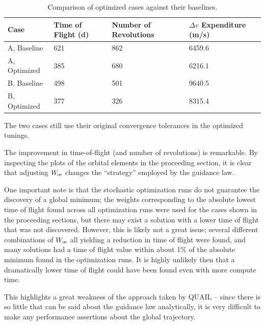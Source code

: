 \begin{table}[H]
    \centering
    \begin{tabular}{L{5cm}L{2.5cm}L{2.5cm}L{3cm}}
        \toprule
        \textbf{Case}                          & Time of Flight (d) & Number of Revolutions & \(\Delta v\) Expenditure (m/s) \\
        \midrule
        A, Baseline                            & 621                & 862                   & 6459.6                         \\
        A, Optimized  & 385                & 680                   & 6216.1                         \\
        B, Baseline                            & 498                & 501                   & 9640.5                         \\
         B, Optimized & 377                & 326                   & 8315.4                         \\
        \bottomrule
    \end{tabular}
    \caption{Comparison of optimized cases against their baselines.}
    \label{tab:outputs_2_summary}
\end{table}

The two cases still use their original convergence tolerances in the optimized tunings.

The improvement in time-of-flight (and number of revolutions) is remarkable. By inspecting the plots of the orbital elements in the proceeding section, it is clear that adjusting \(W_\moe\) changes the ``strategy'' employed by the guidance law.

One important note is that the stochastic optimization runs do not guarantee the discovery of a global minimum; the weights corresponding to the absolute lowest time of flight found across all optimization runs were used for the cases shown in the proceeding sections, but there may exist a solution with a lower time of flight that was not discovered. However, this is likely not a great issue; several different combinations of \(W_\moe\) all yielding a reduction in time of flight were found, and many solutions had a time of flight value within about 1\% of the absolute minimum found in the optimization runs. It is highly unlikely then that a dramatically lower time of flight could have been found even with more compute time.

This highlights a great weakness of the approach taken by QUAIL -- since there is so little that can be said about the guidance law analytically, it is very difficult to make any performance assertions about the global trajectory.

